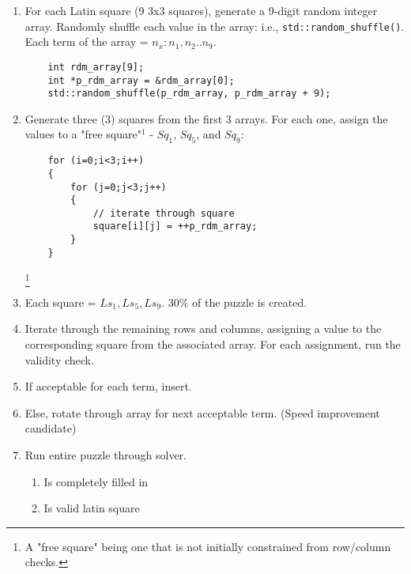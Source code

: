 \documentclass{article}
\begin{document}
\begin{enumerate}
\item For each Latin square (9 3x3 squares), generate a 9-digit random integer array. Randomly shuffle each value in the array: i.e., \texttt{std::random\_shuffle()}. Each term of the array = $n_{x}: n_{1}, n_{2} .. n_{9}$. 
\begin{code}
\begin{lstlisting}
	int rdm_array[9];
	int *p_rdm_array = &rdm_array[0];
	std::random_shuffle(p_rdm_array, p_rdm_array + 9);
\end{lstlisting}
\end{code}

\item Generate three (3) squares from the first 3 arrays. For each one, assign the values to a "free square"$^{1}$ - $Sq_{1}$, $Sq_{5}$, and $Sq_{9}$:
\begin{code}
\begin{lstlisting}
	for (i=0;i<3;i++)
	{
		for (j=0;j<3;j++)
		{
			// iterate through square
			square[i][j] = ++p_rdm_array;
		}
	}
\end{lstlisting}
\end{code}

\footnote[1]{A "free square" being one that is not initially constrained from row/column checks.}

\item Each square = $Ls_{1}, Ls_{5}, Ls_{9}$. 30\% of the puzzle is created.
\item Iterate through the remaining rows and columns, assigning a value to the corresponding square from the associated array. For each assignment, run the validity check.
\item If acceptable for each term, insert.
\item Else, rotate through array for next acceptable term. (Speed improvement candidate)
\item Run entire puzzle through solver. 
	

\begin{enumerate}
\item Is completely filled in
\item Is valid latin square
\end{enumerate}

\end{enumerate}
\end{document}
